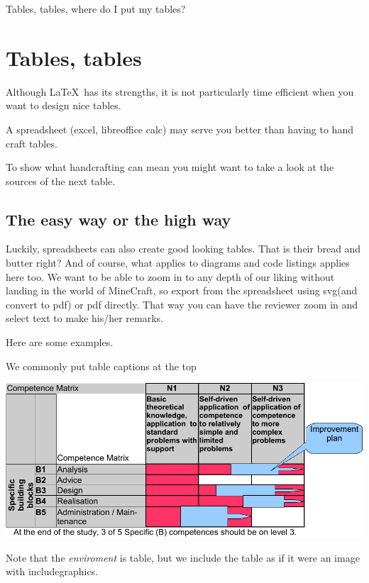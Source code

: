 
\begin{savequote}[15cm]
  \raggedleft
  \sffamily
  Tables, tables, where do I put my tables?
\end{savequote}
\chapter{Tables, tables}

Although \LaTeX\ has its strengths, it is not particularly time efficient when you want to design nice tables.

A spreadsheet (excel, libreoffice calc) may serve you better than having to hand craft tables.

To show what handcrafting can mean you might want to take a look at the sources of the next table.



\section{The easy way or the high way}

Luckily, spreadsheets can also create good looking tables. That is their bread and butter right?
And of course, what applies to diagrams and code listings applies here too. We want to be able to zoom in to any depth
of our liking without landing in the world of MineCraft, so export from the spreadsheet using svg(and convert to pdf) or pdf directly. That way you can have the reviewer zoom in and select text to make his/her remarks.

Here are some examples.

\begin{table}
  \caption{We commonly put table captions at the top}
\includegraphics{tables/matrixExample-crop.pdf}   
\end{table}

Note that the \textit{enviroment} is table, but we include the table as if it were an image with includegraphics.

